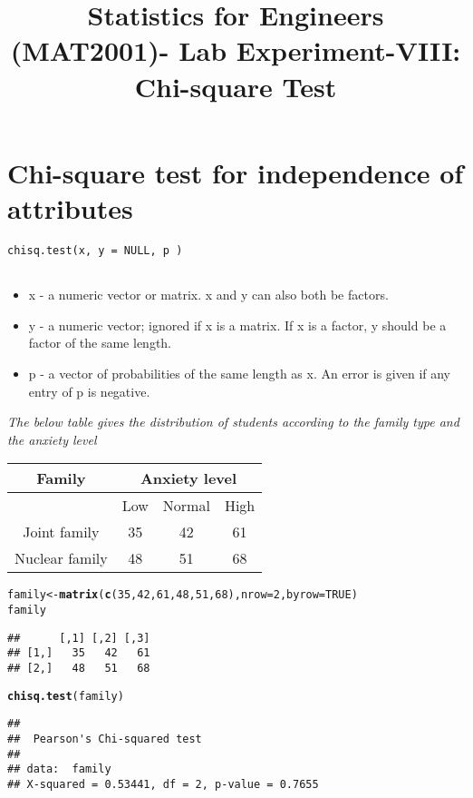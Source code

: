 \documentclass{article}\usepackage[]{graphicx}\usepackage[]{xcolor}
\date{}
\title{\textbf{Statistics for Engineers (MAT2001)- Lab  Experiment-VIII:   Chi-square Test}}
\makeatletter
\newcommand{\hlnum}[1]{\textcolor[rgb]{0.686,0.059,0.569}{#1}}%
\newcommand{\hldef}[1]{\textcolor[rgb]{0.345,0.345,0.345}{#1}}%
\newcommand{\hlkwb}[1]{\textcolor[rgb]{0.69,0.353,0.396}{#1}}%
\newcommand{\hlkwc}[1]{\textcolor[rgb]{0.333,0.667,0.333}{#1}}%
\newcommand{\hlkwd}[1]{\textcolor[rgb]{0.737,0.353,0.396}{\textbf{#1}}}%
\newenvironment{kframe}{%
 \def\at@end@of@kframe{}%
 \ifinner\ifhmode%
  \def\at@end@of@kframe{\end{minipage}}%
  \begin{minipage}{\columnwidth}%
 \fi\fi%
 \def\FrameCommand##1{\hskip\@totalleftmargin \hskip-\fboxsep
 \colorbox{shadecolor}{##1}\hskip-\fboxsep
     \hskip-\linewidth \hskip-\@totalleftmargin \hskip\columnwidth}%
 \MakeFramed {\advance\hsize-\width
   \@totalleftmargin\z@ \linewidth\hsize
   \@setminipage}}%
 {\par\unskip\endMakeFramed%
 \at@end@of@kframe}
\newenvironment{knitrout}{}{} %
\makeatother
\begin{document}
\maketitle
\section{Chi-square test for independence of attributes }
\begin{verbatim}
chisq.test(x, y = NULL, p )


\end{verbatim}
\begin{itemize}
  \item x - a numeric vector or matrix. x and y can also both be factors.
  \item y - a numeric vector; ignored if x is a matrix. If x is a factor, y should be a factor of the same length.\item p - a vector of probabilities of the same length as x. An error is given if any entry of p is negative.
\end{itemize}
\emph{The below table gives the distribution of students according to the family type and the anxiety level
}
\begin{table}[h]
\begin{tabular}{|c|ccc|}
\hline
Family         & \multicolumn{3}{c|}{Anxiety level}                            \\ \hline
               & \multicolumn{1}{c|}{Low} & \multicolumn{1}{c|}{Normal} & High \\ \hline
Joint family   & \multicolumn{1}{c|}{35}  & \multicolumn{1}{c|}{42}     & 61   \\ \hline
Nuclear family & \multicolumn{1}{c|}{48}  & \multicolumn{1}{c|}{51}     & 68   \\ \hline
\end{tabular}
\end{table}
\begin{knitrout}
\color{fgcolor}\begin{kframe}
\begin{alltt}
\hldef{family} \hlkwb{<-} \hlkwd{matrix}\hldef{(}\hlkwd{c}\hldef{(}\hlnum{35}\hldef{,} \hlnum{42}\hldef{,} \hlnum{61}\hldef{,} \hlnum{48}\hldef{,} \hlnum{51}\hldef{,} \hlnum{68}\hldef{),} \hlkwc{nrow} \hldef{=} \hlnum{2}\hldef{,} \hlkwc{byrow} \hldef{=} \hlnum{TRUE}\hldef{)}
\hldef{family}
\end{alltt}
\begin{verbatim}
##      [,1] [,2] [,3]
## [1,]   35   42   61
## [2,]   48   51   68
\end{verbatim}
\begin{alltt}
\hlkwd{chisq.test}\hldef{(family)}
\end{alltt}
\begin{verbatim}
## 
## 	Pearson's Chi-squared test
## 
## data:  family
## X-squared = 0.53441, df = 2, p-value = 0.7655
\end{verbatim}
\end{kframe}
\end{knitrout}
\end{document}

